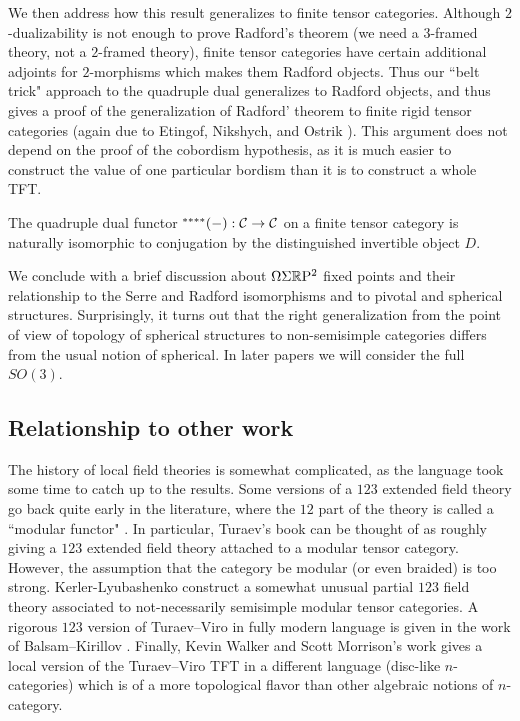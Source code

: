 \documentclass{amsart}
\begin{document}
We then address how this result generalizes to finite tensor categories.  Although $2$-dualizability is not enough to prove Radford's theorem  (we need a $3$-framed theory, not a $2$-framed theory), finite tensor categories have certain additional adjoints for $2$-morphisms which makes them Radford objects.  Thus our ``belt trick" approach to the quadruple dual generalizes to Radford objects, and thus gives a proof of the generalization of Radford' theorem to finite rigid tensor categories (again due to Etingof, Nikshych, and Ostrik \cite{MR2097289}).  This argument does not depend on the proof of the cobordism hypothesis, as it is much easier to construct the value of one particular bordism than it is to construct a whole TFT.

\begin{maincor} \label{cor8}
The quadruple dual functor ${}^{****}(-): \mathcal C \rightarrow \mathcal C$ on a finite tensor category is naturally isomorphic to conjugation by the distinguished invertible object $D$.
\end{maincor}

We conclude with a brief discussion about $\Omega \Sigma \mathbb R \mathrm{P}^2$ fixed points and their relationship to the Serre and Radford isomorphisms and to pivotal and spherical structures.  Surprisingly, it turns out that the right generalization from the point of view of topology of spherical structures to non-semisimple categories differs from the usual notion of spherical.  In later papers we will consider the full $SO(3)$.


\subsection*{Relationship to other work}

The history of local field theories is somewhat complicated, as the language took some time to catch up to the results.  Some versions of a $123$ extended field theory go back quite early in the literature, where the $12$ part of the theory is called a ``modular functor" \cite{Segal, MR1002038, MR1159969,MR1797619}.  In particular, Turaev's book \cite{MR1292673} can be thought of as roughly giving a $123$ extended field theory attached to a modular tensor category.  However, the assumption that the category be modular (or even braided) is too strong.  Kerler-Lyubashenko \cite{MR1862634} construct a somewhat unusual partial $123$ field theory associated to not-necessarily semisimple modular tensor categories.   A rigorous $123$ version of Turaev--Viro in fully modern language is given in the work of Balsam--Kirillov \cite{1004.1533}.  Finally, Kevin Walker and Scott Morrison's work \cite{kw:tqft, 1009.5025} gives a local version of the Turaev--Viro TFT in a different language (disc-like $n$-categories) which is of a more topological flavor than other algebraic notions of $n$-category.
\end{document}
